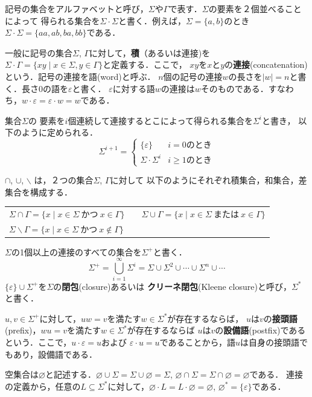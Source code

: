 \documentclass[dvipdfmx,a4j]{jbook}
\begin{document}
記号の集合をアルファベットと呼び，$\Sigma$や$\Gamma$で表す．$\Sigma$の要素を２個並べることによって
得られる集合を$\Sigma\cdot\Sigma$と書く．例えば，$\Sigma=\{a,b\}$のとき
\(\Sigma\cdot\Sigma=\{aa,ab,ba,bb\}\)である．

一般に記号の集合$\Sigma$, $\Gamma$に対して，{\bf 積}（あるいは連接)を
$\Sigma\cdot\Gamma=\{xy\;|\;x\in\Sigma,y\in\Gamma\}$と定義する．ここで，
$xy$を$x$と$y$の{\bf 連接}(concatenation)という．記号の連接を語(word)と呼ぶ．
$n$個の記号の連接$w$の長さを$|w|=n$と書く．長さ0の語を$\varepsilon$と書く．
$\varepsilon$に対する語$w$の連接は$w$そのものである．すなわち，$w\cdot\varepsilon
=\varepsilon\cdot w=w$である．

集合$\Sigma$の
要素を$i$個連続して連接するとこによって得られる集合を$\Sigma^i$と書き，
以下のように定められる．
\[\Sigma^{i+1}=\begin{cases}\{\varepsilon\} & \mbox{$i=0$のとき}\\
  \Sigma\cdot\Sigma^i & \mbox{$i\geq 1$のとき}\end{cases}\]

$\cap$, $\cup$, $\backslash$ は，２つの集合$\Sigma$, $\Gamma$に対して
以下のようにそれぞれ積集合，和集合，差集合を構成する．

\begin{center}
  \begin{tabular}{lcl}
  $\Sigma\cap\Gamma=\{x\;|\;x\in\Sigma\ \mbox{かつ}\ x\in\Gamma\}$
  & &
  $\Sigma\cup\Gamma=\{x\;|\;x\in\Sigma\ \mbox{または}\ x\in\Gamma\}$\\
  $\Sigma\backslash\Gamma=\{x\;|\;x\in\Sigma\ \mbox{かつ}\ x\notin\Gamma\}$
  \end{tabular}
\end{center}

$\Sigma$の1個以上の連接のすべての集合を$\Sigma^+$と書く．
\[\Sigma^+=\bigcup_{i=1}^\infty\Sigma^i=\Sigma\cup\Sigma^2\cup\cdots\cup\Sigma^n\cup\cdots\]
$\{\varepsilon\}\cup\Sigma^+$を$\Sigma$の{\bf 閉包}(closure)あるいは
{\bf クリーネ閉包}(Kleene closure)と呼び，$\Sigma^\ast$と書く．

$u,v\in\Sigma^+$に対して，$uw=v$を満たす$w\in\Sigma^\ast$が存在するならば，
$u$は$v$の{\bf 接頭語}(prefix)，$wu=v$を満たす$w\in\Sigma^\ast$が存在するならば
$u$は$v$の{\bf 設備語}(postfix)であるという．ここで，$u\cdot\varepsilon=u$および
$\varepsilon\cdot u=u$であることから，語$u$は自身の接頭語でもあり，設備語である．

空集合は$\varnothing$と記述する．$\varnothing\cup\Sigma=\Sigma\cup\varnothing=\Sigma$,
$\varnothing\cap\Sigma=\Sigma\cap\varnothing=\varnothing$である．
連接の定義から，任意の$L\subseteq\Sigma^\ast$に対して，$\varnothing\cdot L=
L\cdot\varnothing=\varnothing$, $\varnothing^\ast=\{\varepsilon\}$である．
\end{document}
